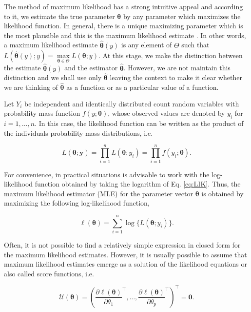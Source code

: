 \documentclass[9pt,a5paper,]{book}
\theoremstyle{definition}
\theoremstyle{definition}
\theoremstyle{remark}
\begin{document}
The method of maximum likelihood has a strong intuitive appeal and
according to it, we estimate the true parameter \(\boldsymbol{\theta}\)
by any parameter which maximizes the likelihood function. In general,
there is a unique maximizing parameter which is the most plausible and
this is the maximum likelihood estimate \citep{Silvey:1975}. In other
words, a maximum likelihood estimate \(\hat{\boldsymbol{\theta}}(y)\) is
any element of \(\Theta\) such that
\(L(\hat{\boldsymbol{\theta}}(y);y) = \underset{\boldsymbol{\theta}\in \Theta}\max L(\boldsymbol{\theta};y).\)
At this stage, we make the distinction between the estimate
\(\hat{\boldsymbol{\theta}}(y)\) and the estimator
\(\hat{\boldsymbol{\theta}}\). However, we are not maintain this
distinction and we shall use only \(\hat{\boldsymbol{\theta}}\) leaving
the context to make it clear whether we are thinking of
\(\hat{\boldsymbol{\theta}}\) as a function or as a particular value of
a function.

Let \(Y_i\) be independent and identically distributed count random
variables with probability mass function \(f(y;\boldsymbol{\theta})\),
whose observed values are denoted by \(y_i\) for \(i = 1, \ldots, n.\)
In this case, the likelihood function can be written as the product of
the individuals probability mass distributions, i.e.

\begin{equation}
L(\boldsymbol{\theta};\boldsymbol{y}) = \prod_{i=1}^n L(\boldsymbol{\theta}; y_i) = \prod_{i=1}^n f(y_i; \boldsymbol{\theta}).
\label{eq:LIK}
\end{equation}

For convenience, in practical situations is advisable to work with the
log-likelihood function obtained by taking the logarithm of Eq.
\eqref{eq:LIK}. Thus, the maximum likelihood estimator (MLE) for the
parameter vector \(\boldsymbol{\theta}\) is obtained by maximizing the
following log-likelihood function,

\begin{equation}
\ell(\boldsymbol{\theta})=\sum^n_{i=1} \log\{ L(\boldsymbol{\theta}; y_i) \}.
\label{eq:LOGLIK}
\end{equation}

Often, it is not possible to find a relatively simple expression in
closed form for the maximum likelihood estimates. However, it is usually
possible to assume that maximum likelihood estimates emerge as a
solution of the likelihood equations or also called score functions,
i.e.

\begin{equation}
\mathcal{U}(\boldsymbol{\theta}) = \left ( \frac{\partial \ell(\boldsymbol{\theta})}{\partial \theta_1}^\top, \ldots, \frac{\partial \ell(\boldsymbol{\theta})}{\partial \theta_p}^\top \right )^\top = \boldsymbol{0}.
\label{eq:SCORE}
\end{equation}
\end{document}
